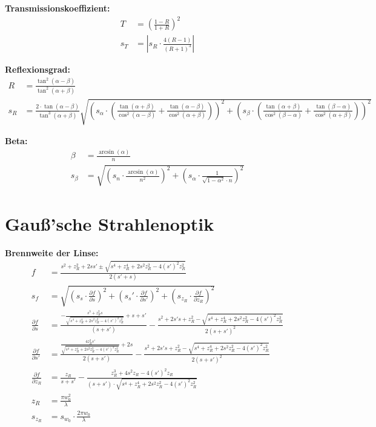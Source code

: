 \textbf{Transmissionskoeffizient:}
\begin{align}
    T&=\left(\frac{1-R}{1+R}\right)^2\\
    s_T&=\left|s_R\cdot\frac{4\left(R-1\right)}{\left(R+1\right)^3}\right|
\end{align}

\textbf{Reflexionsgrad:}
\begin{align}
    R&=\frac{\tan^2\left(\alpha-\beta\right)}{\tan^2\left(\alpha+\beta\right)}\\
    s_R&=\frac{2\cdot\tan(\alpha-\beta)}{\tan^3\left(\alpha+\beta\right)}\sqrt{\left(s_\alpha\cdot\left(\frac{\tan(\alpha+\beta)}{\cos^2(\alpha-\beta)}+\frac{\tan(\alpha-\beta)}{\cos^2(\alpha+\beta)}\right)\right)^2+\left(s_\beta\cdot\left(\frac{\tan(\alpha+\beta)}{\cos^2(\beta-\alpha)}+\frac{\tan(\beta-\alpha)}{\cos^2(\alpha+\beta)}\right)\right)^2}
\end{align}

\textbf{Beta:}
\begin{align}
    \beta&=\frac{\arcsin(\alpha)}{n}\\
    s_\beta&=\sqrt{\left(s_n\cdot\frac{\arcsin(\alpha)}{n^2}\right)^2+\left(s_\alpha\cdot\frac{1}{\sqrt{1-\alpha^2}\cdot n}\right)^2}
\end{align}

\section{Gauß'sche Strahlenoptik}
\textbf{Brennweite der Linse:}
\begin{align}
    f&=\frac{s^2+z_R^2+2ss'\pm\sqrt{s^4+z_R^4+2s^2z_R^2-4(s')^2z_R^2}}{2(s'+s)}\\
    s_f&=\sqrt{\left(s_s\cdot\frac{\partial f}{\partial s}\right)^2+\left(s_s'\cdot\frac{\partial f}{\partial s'}\right)^2+\left(s_{z_R}\cdot\frac{\partial f}{\partial z_R}\right)^2}\\
    \frac{\partial f}{\partial s}&=\frac{-\frac{s^3+z_R^2s}{\sqrt{s^4+z_R^4+2s^2z_R^2-4(s')^2z_R^2}}+s+s'}{(s+s')}-\frac{s^2+2s's+z_R^2-\sqrt{s^4+z_R^4+2s^2z_R^2-4(s')^2z_R^2}}{2(s+s')^2}\\
    \frac{\partial f}{\partial s'}&=\frac{\frac{4z_R^2s'}{\sqrt{s^4+z_R^4+2s^2z_R^2-4(s')^2z_R^2}}+2s}{2(s+s')}-\frac{s^2+2s's+z_R^2-\sqrt{s^4+z_R^4+2s^2z_R^2-4(s')^2z_R^2}}{2(s+s')^2}\\
    \frac{\partial f}{\partial z_R}&=\frac{z_R}{s+s'}-\frac{z_R^3+4s^2z_R-4(s')^2z_R}{\left(s+s'\right)\cdot\sqrt{s^4+z_R^4+2s^2z_R^2-4(s')^2z_R^2}}\\
    z_R&=\frac{\pi w_0^2}{\lambda}\\
    s_{z_R}&=s_{w_0}\cdot\frac{2\pi w_0}{\lambda}
\end{align}


